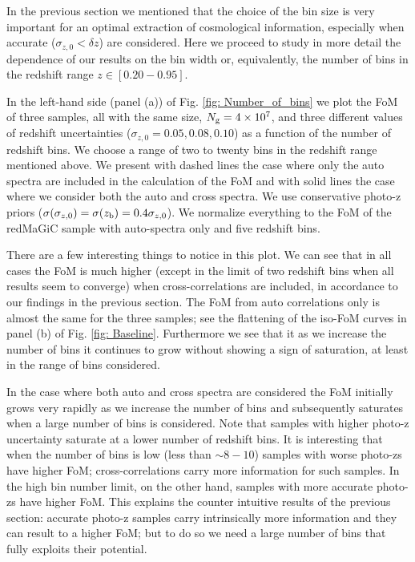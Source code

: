 \documentclass[a4paper,fleqn,usenatbib]{mnras}
\begin{document}
In the previous section we mentioned that the choice of the bin size is very important for an optimal extraction of cosmological information, especially when accurate ($\sigma_{z,0} < \delta z$)  are considered. Here we proceed to study in more detail the dependence of our results on the bin width or, equivalently, the number of bins in the redshift range $z \in [0.20-0.95]$. 

In the left-hand side (panel (a)) of Fig. \ref{fig: Number_of_bins} we plot the FoM of three samples, all with the same size, $N_{\mbox{\scriptsize{g}}} = 4 \times 10^7$, and three different values of redshift uncertainties ($\sigma_{z,0} = 0.05, 0.08, 0.10$) as a function of the number of redshift bins. We choose a range of two to twenty bins in the redshift range mentioned above. We present with dashed lines the case where only the auto spectra are included in the calculation of the FoM and with solid lines the case where we consider both the auto and cross spectra. We use conservative photo-z priors ($\sigma(\sigma_{z,0}) = \sigma(z_{\mbox{\scriptsize{b}}}) = 0.4  \sigma_{z,0}$). We normalize everything to the FoM of the redMaGiC sample with auto-spectra only and five redshift bins.

There are a few interesting things to notice in this plot. We can see that in all cases the FoM is much higher (except in the limit of two redshift bins when all results seem to converge) when cross-correlations are included, in accordance to our findings in the previous section. The FoM from auto correlations only is almost the same for the three samples; see the flattening of the iso-FoM curves in panel (b) of Fig. \ref{fig: Baseline}. Furthermore we see that it as we increase the number of bins it continues to grow without showing a sign of saturation, at least in the range of bins considered. 

In the case where both auto and cross spectra are considered the FoM initially grows very rapidly as we increase the number of bins and subsequently saturates when a large number of bins is considered. Note that samples with higher photo-z uncertainty saturate at a lower number of redshift bins. It is interesting that when the number of bins is low (less than $\sim 8-10$) samples with worse photo-zs have higher FoM; cross-correlations carry more information for such samples. In the high bin number limit, on the other hand, samples with more accurate photo-zs have higher FoM. This explains the counter intuitive results of the previous section: accurate photo-z samples carry intrinsically more information and they can result to a higher FoM; but to do so we need a large number of bins that fully exploits their potential.
\end{document}
